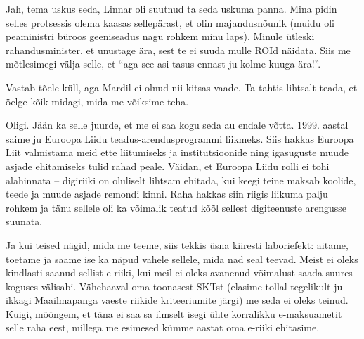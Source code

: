 
Jah, tema uskus seda, Linnar oli suutnud ta seda 
uskuma panna. Mina pidin selles protsessis olema kaasas sellepärast, et 
olin majandusnõunik (muidu oli peaministri büroos geeniseadus nagu rohkem minu laps). Minule ütleski rahandusminister, et unustage ära, sest te ei 
suuda mulle ROId näidata. Siis me mõtlesimegi välja selle, et \enquote{aga 
see asi tasus ennast ju kolme kuuga ära!}.


Vastab tõele küll, aga Mardil ei olnud nii kitsas vaade. Ta tahtis lihtsalt 
teada, et öelge kõik midagi, mida me võiksime teha.


Oligi. Jään ka selle juurde, et me ei saa kogu seda au endale võtta. 
1999. aastal saime ju Euroopa Liidu teadus-arendusprogrammi liikmeks. Siis hakkas Euroopa Liit valmistama meid ette 
liitumiseks ja institutsioonide ning igasuguste muude asjade ehitamiseks tulid rahad peale. Väidan, et Euroopa Liidu rolli ei tohi alahinnata -- 
digiriiki on oluliselt lihtsam ehitada, kui keegi teine maksab koolide, teede ja muude asjade 
remondi kinni. Raha hakkas siin riigis liikuma palju rohkem ja tänu sellele oli ka võimalik 
teatud kõõl sellest digiteenuste arengusse suunata.


Ja kui teised nägid, mida me teeme, siis tekkis üsna kiiresti laboriefekt: 
aitame, toetame ja saame ise ka näpud vahele sellele, mida nad seal teevad. Meist ei oleks
kindlasti saanud sellist e-riiki, kui meil ei oleks avanenud 
võimalust saada suures koguses välisabi. Vähehaaval oma toonasest SKTst (elasime tollal tegelikult ju ikkagi Maailmapanga vaeste riikide 
kriteeriumite järgi) me seda ei oleks teinud. Kuigi, mööngem, et 
täna ei saa sa ilmselt isegi ühte korralikku e-maksuametit selle raha eest, millega me 
esimesed kümme aastat oma e-riiki ehitasime.


